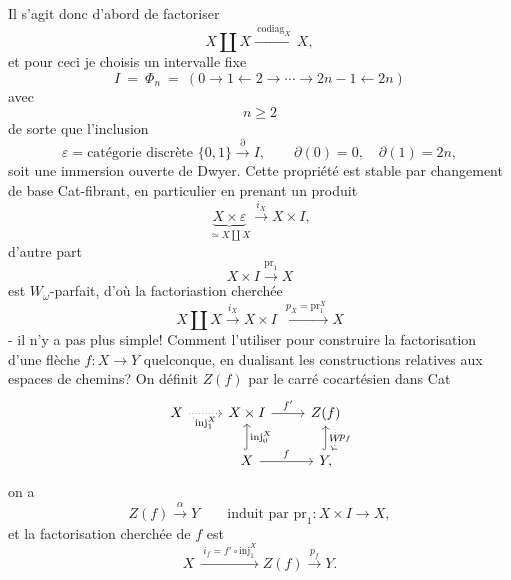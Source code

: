 \documentclass[11pt]{article}
\newcommand{\printedpage}[1]{\marginpar{\footnotesize p.~#1}}
\newcommand{\msp}[1]{\marginpar{\footnotesize [#1]}}
\begin{document}
Il s'agit donc d'abord de factoriser
\[
X \amalg X \xrightarrow{\ \mathrm{codiag}_X\ } X,
\]
et pour ceci je choisis un intervalle fixe
\[
I \ = \ \Phi_n \ = \ (0 \longrightarrow 1 \longleftarrow 2 \longrightarrow \cdots \longrightarrow 2n-1 \longleftarrow 2n)
\]
avec
\[
n \geq 2
\]
de sorte que l'inclusion
\[
\varepsilon = \text{catégorie discrète } \{0,1\} \xrightarrow{\partial} I, \qquad \partial(0) = 0, \quad \partial(1) = 2n,
\]
soit une immersion ouverte de Dwyer. Cette propriété est stable par changement de base Cat-fibrant, en particulier en prenant un produit
\[
\underbrace{X \times \varepsilon}_{\simeq X \coprod X} \xrightarrow{i_X} X \times I,
\]
\begingroup\renewcommand{\thefootnote}{}\endgroup
\printedpage{146}
\msp{page 229}
d'autre part
\[
X \times I \xrightarrow{\mathrm{pr}_1} X
\]
est $W_\omega$-parfait, d'où la factoriastion cherchée %
\[
X \amalg X \xrightarrow{i_X} X \times I \ \xrightarrow{\ p_X = \mathrm{pr}_1^X\ } X
\]
- il n'y a pas plus simple! Comment l'utiliser pour construire la factorisation d'une flèche $f : X \longrightarrow Y$ quelconque, en dualisant les constructions relatives aux espaces de chemins? On définit $Z(f)$ par le carré cocartésien dans Cat
\[
\begin{tikzcd}
X \arrow[r, dotted, "\mathrm{inj}_1^X"'] & X \times I \arrow[r, "f'"] & Z(f) \arrow[d, dotted, bend left, "p_f"] \\
& X \arrow[u, hook, "\mathrm{inj}_0^X"'] \arrow[r, "f"] & Y, \arrow[u, hook, "W"']
\end{tikzcd}
\]
on a
\[
Z(f) \xrightarrow{\alpha} Y \qquad \text{induit par } \mathrm{pr}_1 : X \times I \longrightarrow X,
\]
et la factorisation cherchée de $f$ est
\[
X \ \xrightarrow{\ i_f = f' \circ \mathrm{inj}_1^X\ } Z(f) \xrightarrow{p_f} Y.
\]
\end{document}
